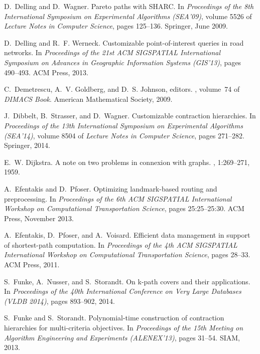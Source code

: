 \documentclass{sig-alternate}
\begin{document}
\begin{thebibliography}{10}
D.~Delling and D.~Wagner.
\newblock Pareto paths with {SHARC}.
\newblock In {\em Proceedings of the 8th International Symposium on
  Experimental Algorithms (SEA'09)}, volume 5526 of {\em Lecture Notes in
  Computer Science}, pages 125--136. Springer, June 2009.

D.~Delling and R.~F. Werneck.
\newblock Customizable point-of-interest queries in road networks.
\newblock In {\em Proceedings of the 21st ACM SIGSPATIAL International
  Symposium on Advances in Geographic Information Systems (GIS'13)}, pages
  490--493. ACM Press, 2013.

C.~Demetrescu, A.~V. Goldberg, and D.~S. Johnson, editors.
, volume~74 of {\em DIMACS Book}.
\newblock American Mathematical Society, 2009.

J.~Dibbelt, B.~Strasser, and D.~Wagner.
\newblock Customizable contraction hierarchies.
\newblock In {\em Proceedings of the 13th International Symposium on
  Experimental Algorithms (SEA'14)}, volume 8504 of {\em Lecture Notes in
  Computer Science}, pages 271--282. Springer, 2014.

E.~W. Dijkstra.
\newblock A note on two problems in connexion with graphs.
, 1:269--271, 1959.

A.~Efentakis and D.~Pfoser.
\newblock Optimizing landmark-based routing and preprocessing.
\newblock In {\em Proceedings of the 6th ACM SIGSPATIAL International Workshop
  on Computational Transportation Science}, pages 25:25--25:30. ACM Press,
  November 2013.

A.~Efentakis, D.~Pfoser, and A.~Voisard.
\newblock Efficient data management in support of shortest-path computation.
\newblock In {\em Proceedings of the 4th ACM SIGSPATIAL International Workshop
  on Computational Transportation Science}, pages 28--33. ACM Press, 2011.

S.~Funke, A.~Nusser, and S.~Storandt.
\newblock On k-path covers and their applications.
\newblock In {\em Proceedings of the 40th International Conference on Very
  Large Databases (VLDB 2014)}, pages 893--902, 2014.

S.~Funke and S.~Storandt.
\newblock Polynomial-time construction of contraction hierarchies for
  multi-criteria objectives.
\newblock In {\em Proceedings of the 15th Meeting on Algorithm Engineering and
  Experiments (ALENEX'13)}, pages 31--54. SIAM, 2013.


\end{thebibliography}
\end{document}
